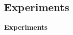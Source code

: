 \documentclass[10pt,titlepage,english,presentation]{beamer}
\begin{document}
%
%
%
%
%
%

\subsection{Experiments}

\begin{frame}
\centering
\vfill\Huge\textbf{\textcolor{HUBblue}{Experiments}}\vfill
\end{frame}
\end{document}
